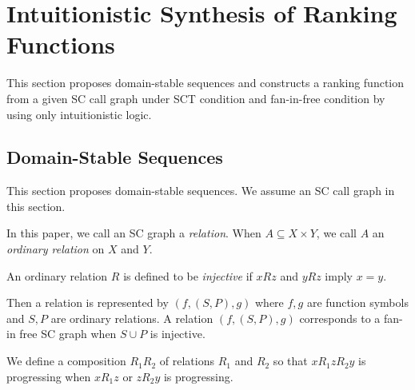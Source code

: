 \section{Intuitionistic Synthesis of Ranking Functions}

This section proposes domain-stable sequences and
constructs a ranking function from a given SC call graph
under SCT condition and fan-in-free condition
by using only intuitionistic logic.

\subsection{Domain-Stable Sequences}

This section proposes domain-stable sequences.
%
We assume an SC call graph in this section.


\begin{Def}\rm
In this paper, we call an SC graph a {\em relation}.
When $A \subseteq X \times Y$,
we call $A$ an {\em ordinary relation} on $X$ and $Y$.

An ordinary relation $R$ is defined to be {\em injective}
if $x R z$ and $y R z$ imply $x=y$.
\end{Def}

Then a relation is represented by $(f,(S,P),g)$ where
$f,g$ are function symbols and $S,P$ are ordinary relations.
%
A relation $(f,(S,P),g)$
corresponds to a fan-in free SC graph \cite{Benamram09}
when $S \cup P$ is injective.

We define a composition $R_1R_2$ of relations $R_1$ and $R_2$ so that
$x R_1 z R_2 y$ is progressing when
$x R_1 z$ or $z R_2 y$ is progressing.

